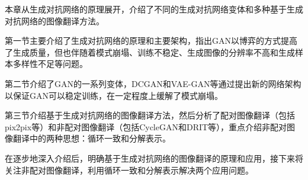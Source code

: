 本章从生成对抗网络的原理展开，介绍了不同的生成对抗网络变体和多种基于生成对抗网络的图像翻译方法。

第一节主要介绍了生成对抗网络的原理和主要架构，指出GAN以博弈的方式提高了生成质量，但也伴随着模式崩塌、训练不稳定、生成图像的分辨率不高和生成样本多样性不足等问题。

第二节介绍了GAN的一系列变体，DCGAN和VAE-GAN等通过提出新的网络架构以保证GAN可以稳定训练，在一定程度上缓解了模式崩塌。

第三节介绍基于生成对抗网络的图像翻译方法，然后分析了配对图像翻译（包括pix2pix等）和非配对图像翻译（包括CycleGAN和DRIT等），重点介绍非配对图像翻译中的两种思想：循环一致和分解表示。

在逐步地深入介绍后，明确基于生成对抗网络的图像翻译的原理和应用，接下来将关注非配对图像翻译，利用循环一致和分解表示解决两个应用问题。